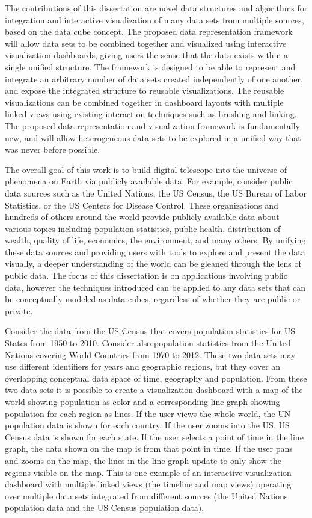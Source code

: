 The contributions of this dissertation are novel data structures and algorithms for integration and interactive visualization of many data sets from multiple sources, based on the data cube concept. The proposed data representation framework will allow data sets to be combined together and visualized using interactive visualization dashboards, giving users the sense that the data exists within a single unified structure. The framework is designed to be able to represent and integrate an arbitrary number of data sets created independently of one another, and expose the integrated structure to reusable visualizations. The reusable visualizations can be combined together in dashboard layouts with multiple linked views using existing interaction techniques such as brushing and linking. The proposed data representation and visualization framework is fundamentally new, and will allow heterogeneous data sets to be explored in a unified way that was never before possible. 

The overall goal of this work is to build digital telescope into the universe of phenomena on Earth via publicly available data. For example, consider public data sources such as the United Nations, the US Census, the US Bureau of Labor Statistics, or the US Centers for Disease Control. These organizations and hundreds of others around the world provide publicly available data about various topics including population statistics, public health, distribution of wealth, quality of life, economics, the environment, and many others. By unifying these data sources and providing users with tools to explore and present the data visually, a deeper understanding of the world can be gleaned through the lens of public data. The focus of this dissertation is on applications involving public data, however the techniques introduced can be applied to any data sets that can be conceptually modeled as data cubes, regardless of whether they are public or private. 

Consider the data from the US Census that covers population statistics for US States from 1950 to 2010. Consider also population statistics from the United Nations covering World Countries from 1970 to 2012. These two data sets may use different identifiers for years and geographic regions, but they cover an overlapping conceptual data space of time, geography and population. From these two data sets it is possible to create a visualization dashboard with a map of the world showing population as color and a corresponding line graph showing population for each region as lines. If the user views the whole world, the UN population data is shown for each country. If the user zooms into the US, US Census data is shown for each state. If the user selects a point of time in the line graph, the data shown on the map is from that point in time. If the user pans and zooms on the map, the lines in the line graph update to only show the regions visible on the map. This is one example of an interactive visualization dashboard with multiple linked views (the timeline and map views) operating over multiple data sets integrated from different sources (the United Nations population data and the US Census population data).


